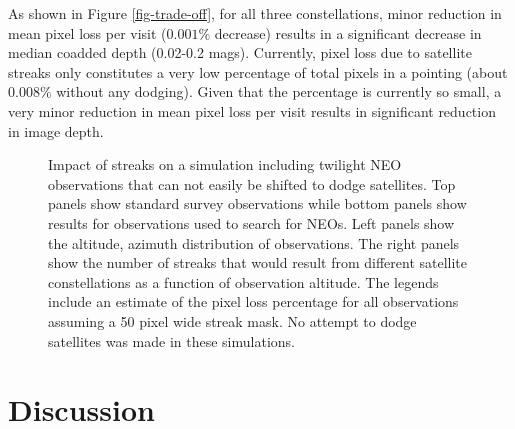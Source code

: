 \documentclass[linenumbers]{aastex631}
\begin{document}
As shown in Figure \ref{fig-trade-off}, for all three constellations, minor reduction in mean pixel loss per visit ($0.001\%$ decrease) results in a significant decrease in median coadded depth (0.02-0.2 mags). Currently, pixel loss due to satellite streaks only constitutes a very low percentage of total pixels in a pointing (about $0.008\%$ without any dodging). Given that the percentage is currently so small, a very minor reduction in mean pixel loss per visit results in significant reduction in image depth.

\begin{figure}
    \centering
    \caption{Impact of streaks on a simulation including twilight NEO observations that can not easily be shifted to dodge satellites. Top panels show standard survey observations while bottom panels show results for observations used to search for NEOs. Left panels show the altitude, azimuth distribution of  observations. The right panels show the number of streaks that would result from different satellite constellations as a function of observation altitude. The legends include an estimate of the pixel loss percentage for all observations assuming a 50 pixel wide streak mask. No attempt to dodge satellites was made in these simulations.}
    \label{fig:twi_neo}
\end{figure}


\section{Discussion}\label{discuss}
\end{document}
